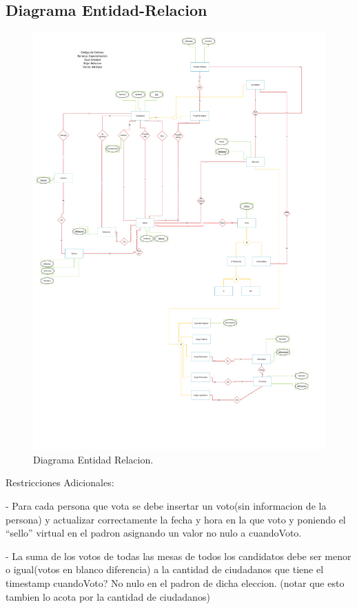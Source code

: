 \subsection{Diagrama Entidad-Relacion}
	\begin{figure}
	  \centering	
		\includegraphics[scale=0.50]{fig/der.pdf}
	  \caption{Diagrama Entidad Relacion.}
	\end{figure}
\newpage

Restricciones Adicionales:

- Para cada persona que vota se debe insertar un voto(sin informacion de la persona) y actualizar correctamente la fecha y hora en la que voto y poniendo el “sello” virtual en el padron asignando un valor no nulo a cuandoVoto.

- La suma de los votos de todas las mesas de todos los candidatos debe ser menor o igual(votos en blanco diferencia) a la cantidad de ciudadanos que tiene el timestamp cuandoVoto? No nulo en el padron de dicha eleccion. (notar que esto tambien lo acota por la cantidad de ciudadanos)


